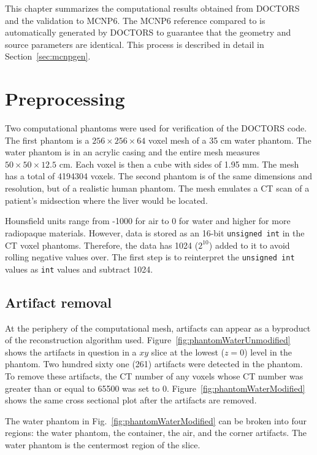 
This chapter summarizes the computational results obtained from DOCTORS and the validation to MCNP6. The MCNP6 reference compared to is automatically generated by DOCTORS to guarantee that the geometry and source parameters are identical. This process is described in detail in Section~\ref{sec:mcnpgen}.

\section{Preprocessing}
Two computational phantoms were used for verification of the DOCTORS code. The first phantom is a $256 \times 256 \times 64$ voxel mesh of a 35 cm water phantom. The water phantom is in an acrylic casing and the entire mesh measures $50 \times 50 \times 12.5$ cm. Each voxel is then a cube with sides of 1.95 mm. The mesh has a total of 4194304 voxels. The second phantom is of the same dimensions and resolution, but of a realistic human phantom. The mesh emulates a CT scan of a patient's midsection where the liver would be located.

Hounsfield units range from -1000 for air to 0 for water and higher for more radiopaque materials. However, data is stored as an 16-bit \texttt{unsigned int} in the CT voxel phantoms. Therefore, the data has 1024 ($2^{10}$) added to it to avoid rolling negative values over. The first step is to reinterpret the \texttt{unsigned int} values as \texttt{int} values and subtract 1024.

\subsection{Artifact removal}
At the periphery of the computational mesh, artifacts can appear as a byproduct of the reconstruction algorithm used. Figure~\ref{fig:phantomWaterUnmodified} shows the artifacts in question in a $xy$ slice at the lowest ($z = 0$) level in the phantom. Two hundred sixty one (261) artifacts were detected in the phantom. To remove these artifacts, the CT number of any voxels whose CT number was greater than or equal to 65500 was set to 0. Figure~\ref{fig:phantomWaterModified} shows the same cross sectional plot after the artifacts are removed.

The water phantom in Fig.~\ref{fig:phantomWaterModified} can be broken into four regions: the water phantom, the container, the air, and the corner artifacts. The water phantom is the centermost region of the slice.

